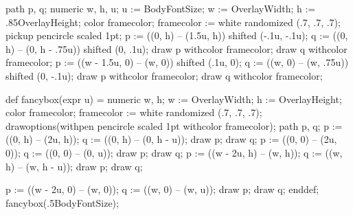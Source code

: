 \setupinteraction[state=start, focus=standard, color=darkred]
\setuppapersize[A4][A4]
\setuplayout[backspace=3cm,width=15cm,
             topspace=1.5cm,header=1.5cm,
             height=27.2cm,footer=1cm]
\setuphead[title][header=empty, footer=empty, style=\bfc, align={middle,broad}]

\setupfootnotes[textstyle=bold]
\setuppagenumbering[location={footer, right}]

\setuphead[subject][incrementnumber=list]
\setupcombinedlist[content][list={section,subject},criterium=text]

\setupwhitespace[medium]
\setupinterlinespace[line=16pt]

\def\dollar{\color[darkblue]{\tt \$}}

path p, q;
numeric w, h, u;
u := BodyFontSize;
w := OverlayWidth; h := .85OverlayHeight;
color framecolor; framecolor := white randomized (.7, .7, .7);
pickup pencircle scaled 1pt;
p := ((0, h) -- (1.5u, h)) shifted (-.1u, -.1u);
q := ((0, h) -- (0, h - .75u)) shifted (0, .1u);
draw p withcolor framecolor;
draw q withcolor framecolor;
p := ((w - 1.5u, 0) -- (w, 0)) shifted (.1u, 0);
q := ((w, 0) -- (w, .75u)) shifted (0, -.1u);
draw p withcolor framecolor;
draw q withcolor framecolor;
\stopuniqueMPgraphic
{}
\def\boxquote#1{%
  \kern.25em%
  \inframed[frame=off,background=boxquotebg,offset=0pt,loffset=.25em,roffset=.25em]{#1}%
  \kern.25em%
}

\setupexternalfigures[directory={./figures}]

\startMPinclusions
def fancybox(expr u) =
numeric w, h;
w := OverlayWidth; h := OverlayHeight;
color framecolor; framecolor := white randomized (.7, .7, .7);
drawoptions(withpen pencircle scaled 1pt withcolor framecolor);
path p, q;
p := ((0, h) -- (2u, h));
q := ((0, h) -- (0, h - u));
draw p; draw q;
p := ((0, 0) -- (2u, 0));
q := ((0, 0) -- (0, u));
draw p; draw q;
p := ((w - 2u, h) -- (w, h));
q := ((w, h) -- (w, h - u));
draw p; draw q;

p := ((w - 2u, 0) -- (w, 0));
q := ((w, 0) -- (w, u));
draw p; draw q;
enddef;
\stopMPinclusions
{}
fancybox(.5BodyFontSize);
\stopuseMPgraphic
{}


